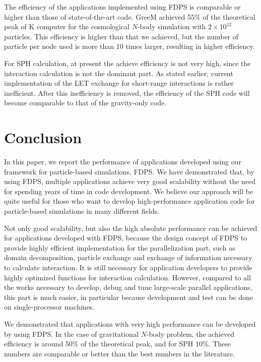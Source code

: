 \documentclass[dvipdfmx]{acm_proc_article-sp}
\begin{document}
The efficiency of the applications implemented using 
FDPS is comparable or higher than  those of state-of-the-art code.
GreeM 
\cite{ishiyama:gordonbell} achieved 55\% of the theoretical peak
of K computer for the cosmological $N$-body simulation with $2 \times
10^{12}$ particles. This efficiency is higher than that we achieved,
but the number of particle per node  used is more than 10 times
larger, resulting in higher efficiency.

For SPH calculation, at present the achieve efficiency is not very
high, since the interaction calculation is not the dominant part.  As
stated earlier, current implementation of the LET exchange for
short-range interactions is rather inefficient.  After this
inefficiency is removed, the efficiency of the SPH code will become
comparable to that of the gravity-only code. 


\section{Conclusion}
\label{sec:conclusion}

In this paper, we report the performance of applications developed
using our framework for particle-based simulations, FDPS. We
have demonstrated that, by using FDPS, multiple applications achieve very
good scalability without the need for spending years of time in code
development. We believe our approach will  be quite useful
for those who want to develop high-performance application code for
particle-based simulations in many different fields. 

Not only good scalability, but also the high absolute performance can
be achieved for applications developed with FDPS, because the design
concept of FDPS to provide highly efficient implementation for the
parallelization part, such as domain decomposition, particle exchange
and exchange of information necessary to calculate interaction. It is
still necessary for application developers to provide highly optimized
functions for interaction calculation. However, compared to all the
works necessary to develop,  debug and tune large-scale parallel
applications, this part is much 
easier, in particular because development and test can be done on
single-processor machines.

We demonstrated that applications with very high performance can be
developed by using FDPS. In the case of gravitational $N$-body
problem, the achieved efficiency is around 50\% of the theoretical
peak, and for SPH 10\%. These numbers are comparable or better than the
best numbers in the literature.
\end{document}

